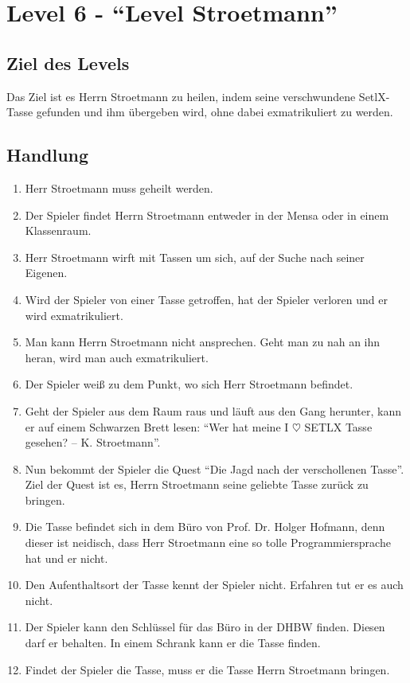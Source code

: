 \section{Level 6 - \enquote{Level Stroetmann}}
\subsection{Ziel des Levels}
Das Ziel ist es Herrn Stroetmann zu heilen, indem seine verschwundene SetlX-Tasse gefunden und ihm übergeben wird, ohne dabei exmatrikuliert zu werden.
\subsection{Handlung}
\begin{enumerate}
\item Herr Stroetmann muss geheilt werden.
\item Der Spieler findet Herrn Stroetmann entweder in der Mensa oder in einem Klassenraum.
\item Herr Stroetmann wirft mit Tassen um sich, auf der Suche nach seiner Eigenen.
\item Wird der Spieler von einer Tasse getroffen, hat der Spieler verloren und er wird exmatrikuliert.
\item Man kann Herrn Stroetmann nicht ansprechen. Geht man zu nah an ihn heran, wird man auch exmatrikuliert.
\item Der Spieler weiß zu dem Punkt, wo sich Herr Stroetmann befindet.
\item Geht der Spieler aus dem Raum raus und läuft aus den Gang herunter, kann er auf einem Schwarzen Brett lesen: \enquote{Wer hat meine I $\heartsuit$ SETLX Tasse gesehen? – K. Stroetmann}.
\item Nun bekommt der Spieler die Quest \enquote{Die Jagd nach der verschollenen Tasse}. Ziel der Quest ist es, Herrn Stroetmann seine geliebte Tasse zurück zu bringen.
\item Die Tasse befindet sich in dem Büro von Prof. Dr. Holger Hofmann, denn dieser ist neidisch, dass Herr Stroetmann eine so tolle Programmiersprache hat und er nicht. 
\item Den Aufenthaltsort der Tasse kennt der Spieler nicht. Erfahren tut er es auch nicht.
\item Der Spieler kann den Schlüssel für das Büro in der DHBW finden. Diesen darf er behalten. In einem Schrank kann er die Tasse finden.
\item Findet der Spieler die Tasse, muss er die Tasse Herrn Stroetmann bringen.

\end{enumerate}

